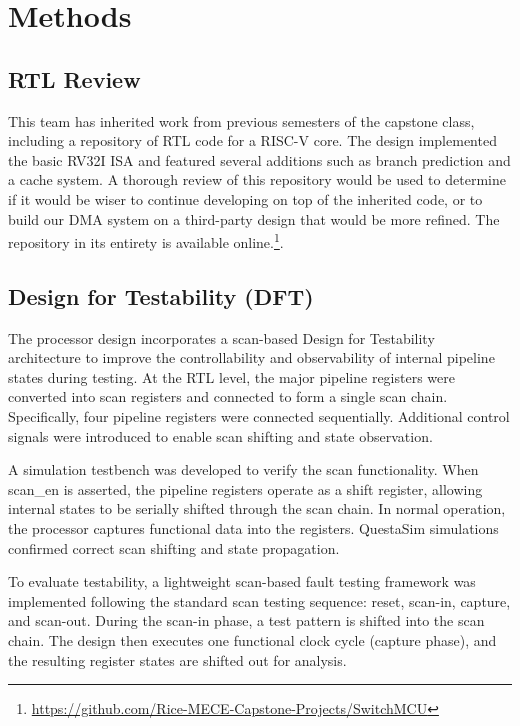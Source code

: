 \documentclass[conference]{IEEEtran}
\begin{document}
\section{Methods} %

\subsection{RTL Review}
This team has inherited work from previous semesters of the capstone class, including a repository of RTL code for a RISC-V core. The design implemented the basic RV32I ISA and featured several additions such as branch prediction and a cache system. A thorough review of this repository would be used to determine if it would be wiser to continue developing on top of the inherited code, or to build our DMA system on a third-party design that would be more refined. The repository in its entirety is available online.\footnote{\url{https://github.com/Rice-MECE-Capstone-Projects/SwitchMCU}}.

\subsection{Design for Testability (DFT)}
The processor design incorporates a scan-based Design for Testability architecture to improve the controllability and observability of internal pipeline states during testing. At the RTL level, the major pipeline registers were converted into scan registers and connected to form a single scan chain. Specifically, four pipeline registers were connected sequentially. Additional control signals were introduced to enable scan shifting and state observation.

A simulation testbench was developed to verify the scan functionality. When scan\_en is asserted, the pipeline registers operate as a shift register, allowing internal states to be serially shifted through the scan chain. In normal operation, the processor captures functional data into the registers. QuestaSim simulations confirmed correct scan shifting and state propagation.

To evaluate testability, a lightweight scan-based fault testing framework was implemented following the standard scan testing sequence: reset, scan-in, capture, and scan-out. During the scan-in phase, a test pattern is shifted into the scan chain. The design then executes one functional clock cycle (capture phase), and the resulting register states are shifted out for analysis.
\end{document}
